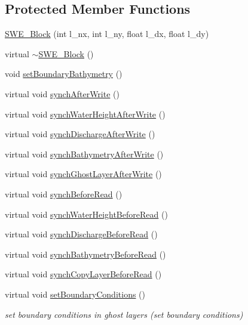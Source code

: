 \subsection*{Protected Member Functions}
\begin{DoxyCompactItemize}
\item 
\hyperlink{classSWE__Block_a114ed3bb6a8a2c482e5f94f768543b82}{S\+W\+E\+\_\+\+Block} (int l\+\_\+nx, int l\+\_\+ny, float l\+\_\+dx, float l\+\_\+dy)
\item 
virtual \hyperlink{classSWE__Block_a2ddff1c284663ba514985a3574def1b0}{$\sim$\+S\+W\+E\+\_\+\+Block} ()
\item 
void \hyperlink{classSWE__Block_a6beb68dacde9c8479647c25c6a5cbcf5}{set\+Boundary\+Bathymetry} ()
\item 
virtual void \hyperlink{classSWE__Block_ae914f9bf6d4ef8f974f9f005114985e7}{synch\+After\+Write} ()
\item 
virtual void \hyperlink{classSWE__Block_aa2924833e29a795d8c04fb79bfe794de}{synch\+Water\+Height\+After\+Write} ()
\item 
virtual void \hyperlink{classSWE__Block_a94c34030153178c9d94f3f14be174eaf}{synch\+Discharge\+After\+Write} ()
\item 
virtual void \hyperlink{classSWE__Block_a4bece8aa90f67e55c40b91aab900febb}{synch\+Bathymetry\+After\+Write} ()
\item 
virtual void \hyperlink{classSWE__Block_a4657993ebdb5f0132b077e63790d0b2b}{synch\+Ghost\+Layer\+After\+Write} ()
\item 
virtual void \hyperlink{classSWE__Block_a23d936cb9a4367092e5b2515f81fe819}{synch\+Before\+Read} ()
\item 
virtual void \hyperlink{classSWE__Block_a07c85681ab29106c3b164db969899ace}{synch\+Water\+Height\+Before\+Read} ()
\item 
virtual void \hyperlink{classSWE__Block_a3773dcb194212fb8cb40ab8465575aa1}{synch\+Discharge\+Before\+Read} ()
\item 
virtual void \hyperlink{classSWE__Block_a7c8258c6949518ca44f4e9ce89d33b09}{synch\+Bathymetry\+Before\+Read} ()
\item 
virtual void \hyperlink{classSWE__Block_a13c90d5a6596336013c41e73c8795f83}{synch\+Copy\+Layer\+Before\+Read} ()
\item 
virtual void \hyperlink{classSWE__Block_a379807f0bf932b40aeb42065633fce60}{set\+Boundary\+Conditions} ()
\begin{DoxyCompactList}\small\item\em set boundary conditions in ghost layers (set boundary conditions) \end{DoxyCompactList}\end{DoxyCompactItemize}
